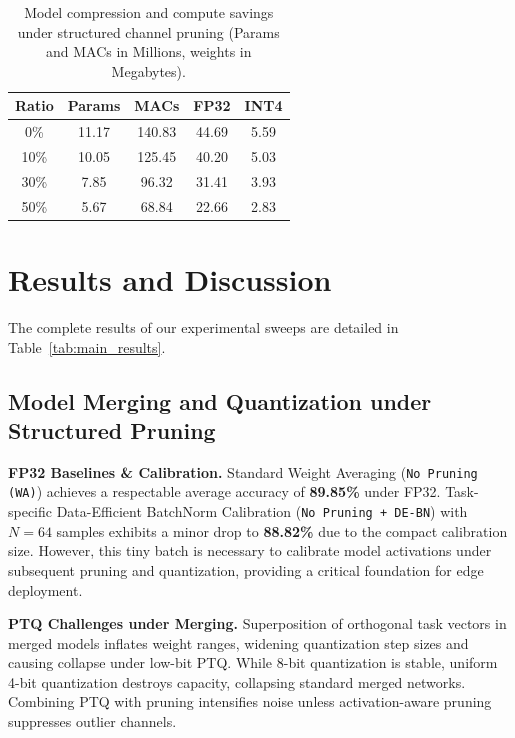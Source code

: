 \documentclass{article}
\theoremstyle{plain}
\theoremstyle{definition}
\theoremstyle{remark}
\begin{document}
\begin{table}[t]
\caption{Model compression and compute savings under structured channel pruning (Params and MACs in Millions, weights in Megabytes).}
\label{tab:hardware_savings}
\vskip 0.15in
\begin{center}
\begin{small}
\begin{sc}
\setlength{\tabcolsep}{5.0pt}
\begin{tabular}{ccccc}
\toprule
Ratio & Params & MACs & FP32 & INT4 \\
\midrule
0\% & 11.17 & 140.83 & 44.69 & 5.59 \\
10\% & 10.05 & 125.45 & 40.20 & 5.03 \\
30\% & 7.85 & 96.32 & 31.41 & 3.93 \\
50\% & 5.67 & 68.84 & 22.66 & 2.83 \\
\bottomrule
\end{tabular}
\end{sc}
\end{small}
\end{center}
\vskip -0.1in
\end{table}

\section{Results and Discussion}
\label{sec:results}

The complete results of our experimental sweeps are detailed in Table~\ref{tab:main_results}.

\subsection{Model Merging and Quantization under Structured Pruning}
\textbf{FP32 Baselines \& Calibration.} Standard Weight Averaging (\texttt{No Pruning (WA)}) achieves a respectable average accuracy of \textbf{89.85\%} under FP32. Task-specific Data-Efficient BatchNorm Calibration (\texttt{No Pruning + DE-BN}) with $N = 64$ samples exhibits a minor drop to \textbf{88.82\%} due to the compact calibration size. However, this tiny batch is necessary to calibrate model activations under subsequent pruning and quantization, providing a critical foundation for edge deployment.

\textbf{PTQ Challenges under Merging.} Superposition of orthogonal task vectors in merged models inflates weight ranges, widening quantization step sizes and causing collapse under low-bit PTQ. While 8-bit quantization is stable, uniform 4-bit quantization destroys capacity, collapsing standard merged networks. Combining PTQ with pruning intensifies noise unless activation-aware pruning suppresses outlier channels.
\end{document}
